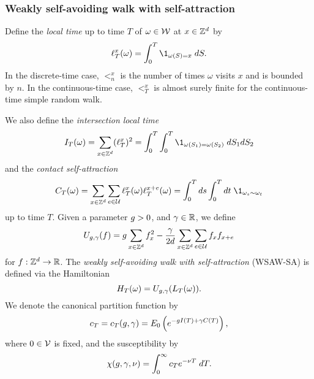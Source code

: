 
\subsubsection{Weakly self-avoiding walk with self-attraction}

Define the \emph{local time} up to time $T$ of $\omega \in \mathcal{W}$ at $x \in { {{\mathbb Z}}^d }$ by
\begin{equation}
\lt^x_T(\omega) = \int_0^T \1_{\omega(S)=x} \; dS.
\end{equation}
In the discrete-time case, $\lt^x_n$ is the number of times $\omega$ visits $x$
and is bounded by $n$. In the continuous-time case, $\lt^x_T$ is almost surely
finite for the continuous-time simple random walk.

We also define the \emph{intersection local time}
\begin{equation}
\label{e:ITdef}
I_T(\omega) = \sum_{x\in\Zd} (\lt^x_T)^2 = \int_0^T \int_0^T \1_{\omega(S_1)=\omega(S_2)} \; dS_1 dS_2
\end{equation}
and the \emph{contact self-attraction}
\begin{equation}
\label{e:CTdef}
C_T(\omega) =
  \sum_{x \in \Z^d}\sum_{e\in\Ucal} \lt_T^x(\omega) \lt_T^{x+e}(\omega)
  = \int_0^T ds \int_0^T dt \; \1_{\omega_{s} \sim \omega_{t}}
\end{equation}
up to time $T$.
Given a parameter $g > 0$,
and $\gamma \in {\mathbb R}$, we define
\begin{equation}
\label{e:Udef-neg}
U_{g,\gamma}(f)
=
g \sum_{x\in{ {{\mathbb Z}}^d }} f_x^2
- \frac{\gamma}{2d}
\sum_{x\in{ {{\mathbb Z}}^d }} \sum_{e\in\mathcal{U}} f_x f_{x+e}
\end{equation}
for $f : { {{\mathbb Z}}^d } \rightarrow {\mathbb R}$.
The \emph{weakly self-avoiding walk with self-attraction} (WSAW-SA) is defined via
the Hamiltonian
\begin{equation}
H_T(\omega) = U_{g,\gamma}(L_T(\omega)).
\end{equation}
We denote the canonical partition function by
\begin{equation}
c_T = c_T(g, \gamma) = E_0 \left( e^{-g I(T) + \gamma C(T)} \right),
\end{equation}
where $0 \in \mathcal{V}$ is fixed, and the susceptibility by
\begin{equation}
\chi(g, \gamma, \nu) = \int_0^\infty c_T e^{-\nu T} \; dT.
\end{equation}

